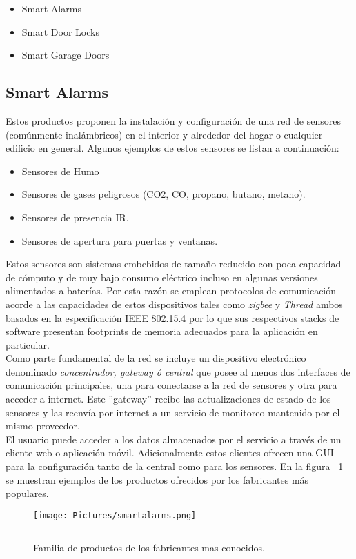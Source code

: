 \begin{itemize}
	\item Smart Alarms
	\item Smart Door Locks
	\item Smart Garage Doors
\end{itemize}

\subsection{Smart Alarms}
Estos productos proponen la instalación y configuración de una red de sensores (comúnmente inalámbricos) en el interior y alrededor del hogar o cualquier edificio en general. Algunos ejemplos de estos sensores se listan a continuación:
\begin{itemize}
	\item Sensores de Humo
	\item Sensores de gases peligrosos (CO2, CO, propano, butano, metano).
	\item Sensores de presencia IR.
	\item Sensores de apertura para puertas y ventanas.
\end{itemize} 
Estos sensores son sistemas embebidos de tamaño reducido con poca capacidad de cómputo y de muy bajo consumo eléctrico incluso en algunas versiones alimentados a baterías.
Por esta razón se emplean protocolos de comunicación acorde a las capacidades de estos dispositivos tales como \textit{zigbee} y \textit{Thread} ambos basados en la especificación IEEE 802.15.4 por lo que sus respectivos stacks de software presentan footprints de memoria adecuados para la aplicación en particular.\\
Como parte fundamental de la red se incluye un dispositivo electrónico denominado \textit{concentrador, gateway ó central} que posee al menos dos interfaces de comunicación principales, una para conectarse a la red de sensores y otra para acceder a internet. Este ''gateway'' recibe las actualizaciones de estado de los sensores y las reenvía por internet a un servicio de monitoreo mantenido por el mismo proveedor.\\
El usuario puede acceder a los datos almacenados por el servicio a través de un cliente web o aplicación móvil.
Adicionalmente estos clientes ofrecen una GUI para la configuración tanto de la central como para los sensores.
En la figura ~\ref{fig:smartalarms} se muestran ejemplos de los productos ofrecidos por los fabricantes más populares.

\begin{figure}[htbp]
	\centering
	\texttt{[image: Pictures/smartalarms.png]}
	\rule{35em}{1pt}
	\caption[Smart Alarms]{Familia de productos de los fabricantes mas conocidos.}
	\label{fig:smartalarms}
\end{figure}

